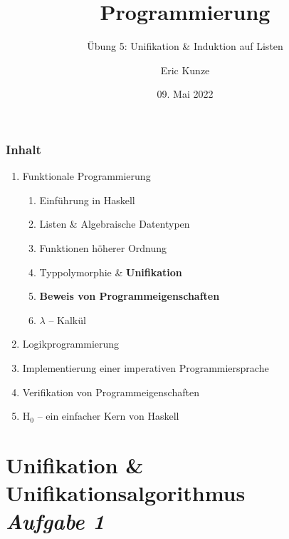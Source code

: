 \documentclass{beamer}
\begin{document}
	
	\title{Programmierung}
	\subtitle{Übung 5: Unifikation \& Induktion auf Listen}
	\author{Eric Kunze}
	\date{09. Mai 2022}
	
	\maketitle
	


\begin{frame}[fragile] \frametitle{Inhalt}
	\begin{enumerate}
		\item Funktionale Programmierung
		\begin{enumerate}
			\item Einführung in Haskell
			\item Listen \& Algebraische Datentypen
			\item Funktionen höherer Ordnung
			\item Typpolymorphie \& \textbf{Unifikation}
			\item \textbf{Beweis von Programmeigenschaften}
			\item $\lambda$ -- Kalkül
		\end{enumerate}
		\item Logikprogrammierung
		\item Implementierung einer imperativen Programmiersprache
		\item Verifikation von Programmeigenschaften
		\item H${}_\text{0}$ -- ein einfacher Kern von Haskell
	\end{enumerate}
\end{frame}



\section{Unifikation \& Unifikationsalgorithmus \\ \textit{\normalsize Aufgabe 1}}
\end{document}

